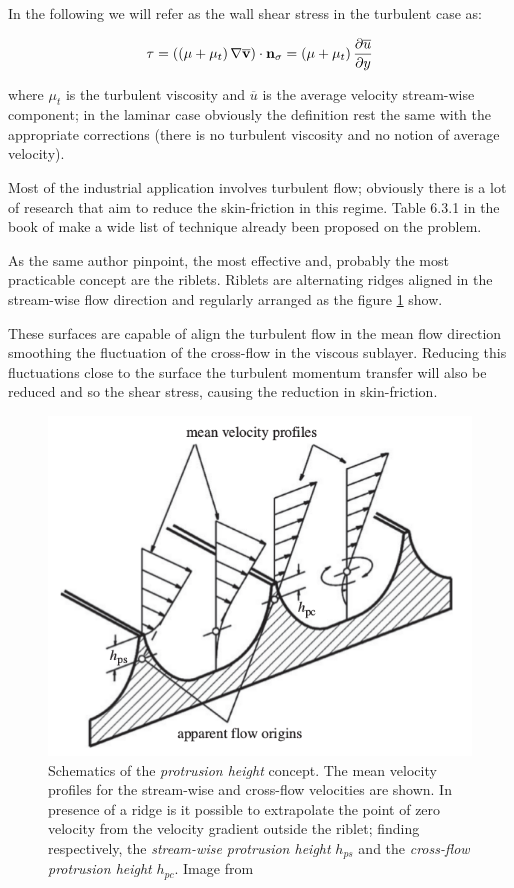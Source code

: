 In the following we will refer as the wall shear stress in the turbulent case as:

\begin{equation}
\tau = \left( \left( \mu + \mu_t \right)  \nabla \mathbf{\overline{v}} \right) \cdot  \mathbf{n}_{\sigma} = \left( \mu + \mu_t \right) \frac{\partial \overline{u}}{\partial y}
\end{equation}

where $\mu_t$ is the turbulent viscosity and $\overline{u}$ is the average velocity stream-wise component; in the laminar case obviously the definition rest the same with the appropriate corrections (there is no turbulent viscosity and no notion of average velocity).

Most of the industrial application involves turbulent flow; obviously there is a lot of research that aim to reduce the skin-friction in this regime.
Table 6.3.1 in the book of \citet{mclean2012understanding} make a wide list of technique already been proposed on the problem.

As the same author pinpoint, the most effective and, probably the most practicable concept are the riblets.
Riblets are alternating ridges aligned in the stream-wise flow direction and regularly arranged as the figure \ref{fig:riblets1} show.

These surfaces are capable of align the turbulent flow in the mean flow direction smoothing the fluctuation of the cross-flow in the viscous sublayer.
Reducing this fluctuations close to the surface the turbulent momentum transfer will also be reduced and so the shear stress, causing the reduction in skin-friction.

\begin{figure}[h]
	\centering
	\includegraphics[width=0.7\linewidth]{chapter_1/riblets3}
	\caption{Schematics of the  \textit{protrusion height} concept. The mean velocity profiles for the stream-wise and cross-flow velocities are shown. In presence of a ridge is it possible to extrapolate the point of zero velocity from the velocity gradient outside the riblet; finding respectively, the \textit{stream-wise protrusion height} $h_{ps}$ and the \textit{cross-flow protrusion height} $h_{pc}$. Image from \citet{bechert1997experiments}}
	\label{fig:riblets1}
\end{figure}

